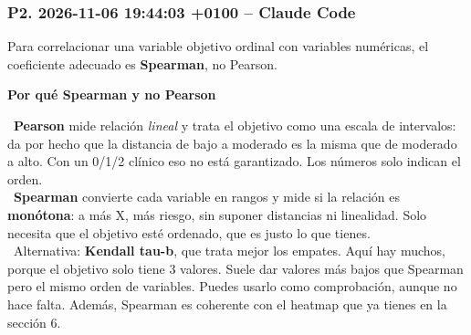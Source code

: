 \documentclass[11pt,a4paper]{article}
\begin{document}
\subsubsection*{P2. 2026-11-06 19:44:03 +0100 -- Claude Code}
{\small
Para correlacionar una variable objetivo ordinal con variables numéricas, el coeficiente adecuado es \textbf{Spearman}, no Pearson.

\smallskip\noindent\textbf{Por qué Spearman y no Pearson}\par
\hspace*{1.0em}\textbullet~\textbf{Pearson} mide relación \textit{lineal} y trata el objetivo como una escala de intervalos: da por hecho que la distancia de bajo a moderado es la misma que de moderado a alto. Con un 0/\allowbreak{}1/\allowbreak{}2 clínico eso no está garantizado. Los números solo indican el orden. \\{}
\hspace*{1.0em}\textbullet~\textbf{Spearman} convierte cada variable en rangos y mide si la relación es \textbf{monótona}: \textquotedbl{}a más X, más riesgo\textquotedbl{}, sin suponer distancias ni linealidad. Solo necesita que el objetivo esté ordenado, que es justo lo que tienes. \\{}
\hspace*{1.0em}\textbullet~Alternativa: \textbf{Kendall tau-b}, que trata mejor los empates. Aquí hay muchos, porque el objetivo solo tiene 3 valores. Suele dar valores más bajos que Spearman pero el mismo orden de variables. Puedes usarlo como comprobación, aunque no hace falta. Además, Spearman es coherente con el heatmap que ya tienes en la sección 6.

}
\end{document}
